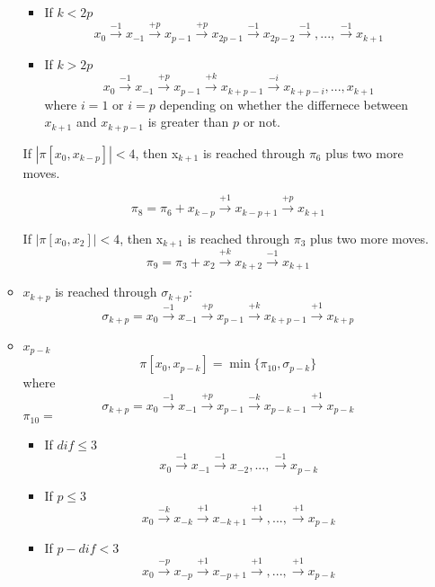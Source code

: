 \begin{itemize}
\begin{itemize}
 \begin{itemize}
\item If $k<2p$
$$    x_{0} \xrightarrow {-1} x_{-1} \xrightarrow {+p} x_{p-1} \xrightarrow {+p} x_{2p-1}
 \xrightarrow {-1}  x_{2p-2} \xrightarrow {-1},..., \xrightarrow {-1} x_{k+1}$$
\item If $k>2p$
$$    x_{0} \xrightarrow {-1} x_{-1} \xrightarrow {+p} x_{p-1} \xrightarrow {+k} x_{k+p-1}
 \xrightarrow {-i}  x_{k+p-i} ,..., x_{k+1}$$
where $i=1$ or $i=p$ depending on whether the differnece between $x_{k+1}$ and $x_{k+p-1}$ is greater than $p$ or not.
\end{itemize}
If $ |\pi[x_0,x_{k-p}]| <4$, then  x$_{k+1}$ is reached through $\pi_6$  plus two more moves.

$$\pi_8= \pi_6 + x_{k-p}\xrightarrow {+1} x_{k-p+1} \xrightarrow {+p}x_{k+1}$$

If $ |\pi[x_0,x_2]| <4$, then  x$_{k+1}$ is reached through $\pi_3$  plus two more moves.
$$\pi_9= \pi_3 + x_{2}\xrightarrow {+k} x_{k+2} \xrightarrow {-1} x_{k+1}$$





\item $x_{k+p}$ is reached through $\sigma_{k+p}$:
$$\sigma_{k+p}= x_{0}\xrightarrow {-1} x_{-1}\xrightarrow {+p} x_{p-1} \xrightarrow {+k} x_{k+p-1}\xrightarrow {+1} x_{k+p}$$%





\item $x_{p-k}$ 
$$ \pi[x_0,x_{p-k}] = \min \{ \pi_{10}, \sigma_{p-k}\}$$
where
$$\sigma_{k+p}= x_{0}\xrightarrow {-1} x_{-1}\xrightarrow {+p} x_{p-1} \xrightarrow {-k} x_{p-k-1}\xrightarrow {+1} x_{p-k}$$%
$\pi_{10}=$
\begin{itemize}
\item If $dif \leq 3$
$$ x_{0}\xrightarrow {-1} x_{-1}\xrightarrow {-1} x_{-2} ,...,\xrightarrow {-1} x_{p-k}$$
\item If $p \leq 3$
$$ x_{0}\xrightarrow {-k} x_{-k}\xrightarrow {+1} x_{-k+1} \xrightarrow {+1} ,...,\xrightarrow {+1} x_{p-k}$$
\item If $p-dif<3$
$$ x_{0}\xrightarrow {-p} x_{-p}\xrightarrow {+1} x_{-p+1} \xrightarrow {+1} ,...,\xrightarrow {+1} x_{p-k}$$


\end{itemize}
\end{itemize}
\end{itemize}
